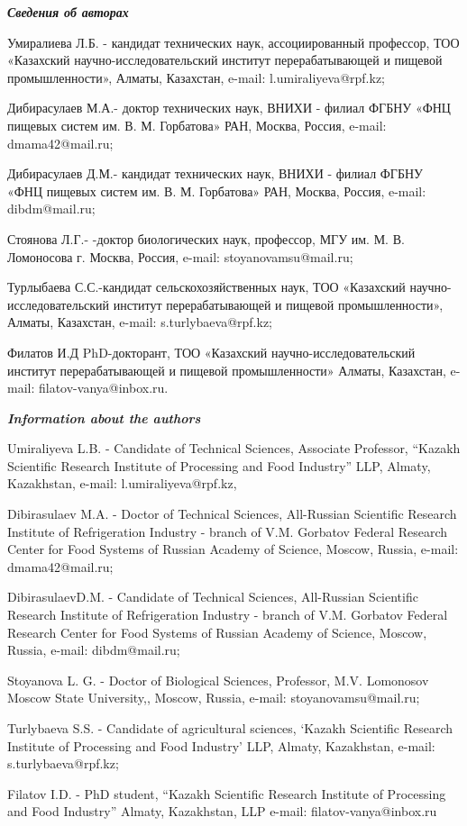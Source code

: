 \begin{info}
\hspace{1em}\emph{{\bfseries Сведения об авторах}}

Умиралиева Л.Б. - кандидат технических наук, ассоциированный
профессор, ТОО «Казахский научно-исследовательский институт
перерабатывающей и пищевой промышленности», Алматы, Казахстан, e-mail:
l.umiraliyeva@rpf.kz;

Дибирасулаев М.А.- доктор технических наук, ВНИХИ - филиал ФГБНУ «ФНЦ
пищевых систем им. В. М. Горбатова» РАН, Москва, Россия, e-mail:
dmama42@mail.ru;

Дибирасулаев Д.М.- кандидат технических наук, ВНИХИ - филиал ФГБНУ
«ФНЦ пищевых систем им. В. М. Горбатова» РАН, Москва, Россия, e-mail:
dibdm@mail.ru;

Стоянова Л.Г.- -доктор биологических наук, профессор, МГУ им. М. В.
Ломоносова г. Москва, Россия, e-mail: stoyanovamsu@mail.ru;

Турлыбаева С.С.-кандидат сельскохозяйственных наук, ТОО «Казахский
научно-исследовательский институт перерабатывающей и пищевой
промышленности», Алматы, Казахстан, e-mail: s.turlybaeva@rpf.kz;

Филатов И.Д PhD-докторант, ТОО «Казахский научно-исследовательский
институт перерабатывающей и пищевой промышленности» Алматы, Казахстан,
e-mail: filatov-vanya@inbox.ru.

\hspace{1em}\emph{{\bfseries Information about the authors}}

Umiraliyeva L.B. - Candidate of Technical Sciences, Associate
Professor, ``Kazakh Scientific Research Institute of Processing and
Food Industry'' LLP, Almaty, Kazakhstan, e-mail: l.umiraliyeva@rpf.kz,

Dibirasulaev M.A. - Doctor of Technical Sciences, All-Russian
Scientific Research Institute of Refrigeration Industry - branch of
V.M. Gorbatov Federal Research Center for Food Systems of Russian
Academy of Science, Moscow, Russia, e-mail: dmama42@mail.ru;

DibirasulaevD.M. - Candidate of Technical Sciences, All-Russian
Scientific Research Institute of Refrigeration Industry - branch of
V.M.  Gorbatov Federal Research Center for Food Systems of Russian
Academy of Science, Moscow, Russia, e-mail: dibdm@mail.ru;

Stoyanova L. G. - Doctor of Biological Sciences, Professor, M.V.
Lomonosov Moscow State University,, Moscow, Russia, e-mail:
stoyanovamsu@mail.ru;

Turlybaeva S.S. - Candidate of agricultural sciences, `Kazakh
Scientific Research Institute of Processing and Food Industry' LLP,
Almaty, Kazakhstan, e-mail: s.turlybaeva@rpf.kz;

Filatov I.D. - PhD student, ``Kazakh Scientific Research Institute of
Processing and Food Industry'' Almaty, Kazakhstan, LLP e-mail:
filatov-vanya@inbox.ru
\end{info}
